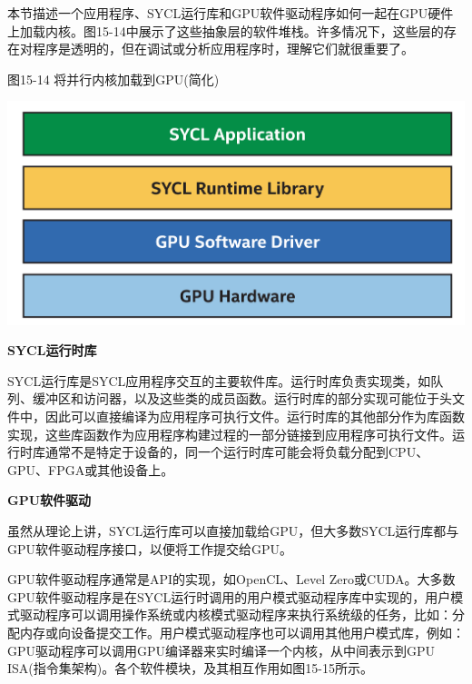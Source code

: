 本节描述一个应用程序、SYCL运行库和GPU软件驱动程序如何一起在GPU硬件上加载内核。图15-14中展示了这些抽象层的软件堆栈。许多情况下，这些层的存在对程序是透明的，但在调试或分析应用程序时，理解它们就很重要了。\par

\hspace*{\fill} \par %
图15-14 将并行内核加载到GPU(简化)
\begin{center}
	\includegraphics[width=1.0\textwidth]{content/chapter-15/images/10}
\end{center}

\hspace*{\fill} \par %
\textbf{SYCL运行时库}

SYCL运行库是SYCL应用程序交互的主要软件库。运行时库负责实现类，如队列、缓冲区和访问器，以及这些类的成员函数。运行时库的部分实现可能位于头文件中，因此可以直接编译为应用程序可执行文件。运行时库的其他部分作为库函数实现，这些库函数作为应用程序构建过程的一部分链接到应用程序可执行文件。运行时库通常不是特定于设备的，同一个运行时库可能会将负载分配到CPU、GPU、FPGA或其他设备上。\par

\hspace*{\fill} \par %
\textbf{GPU软件驱动}

虽然从理论上讲，SYCL运行库可以直接加载给GPU，但大多数SYCL运行库都与GPU软件驱动程序接口，以便将工作提交给GPU。\par

GPU软件驱动程序通常是API的实现，如OpenCL、Level Zero或CUDA。大多数GPU软件驱动程序是在SYCL运行时调用的用户模式驱动程序库中实现的，用户模式驱动程序可以调用操作系统或内核模式驱动程序来执行系统级的任务，比如：分配内存或向设备提交工作。用户模式驱动程序也可以调用其他用户模式库，例如：GPU驱动程序可以调用GPU编译器来实时编译一个内核，从中间表示到GPU ISA(指令集架构)。各个软件模块，及其相互作用如图15-15所示。\par

